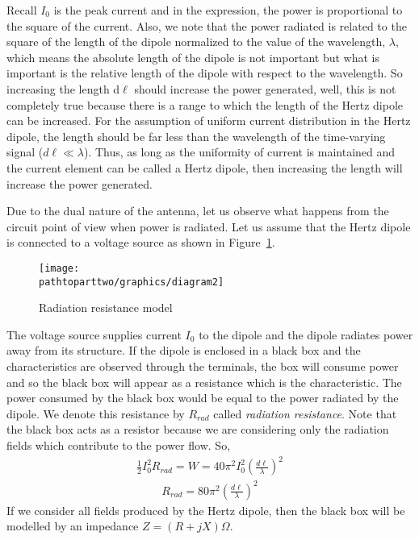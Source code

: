 Recall $I_0$ is the peak current and in the expression, the power is proportional to the square of the current. Also, we note that the power radiated is related to the square of the length of the dipole normalized to the value of the wavelength, $\lambda$, which means the absolute length of the dipole is not important but what is important is the relative length of the dipole with respect to the wavelength. So increasing the length d$\ell$ should increase the power generated, well, this is not completely true because there is a range to which the length of the Hertz dipole can be increased. For the assumption of uniform current distribution in the Hertz dipole, the length should be far less than the wavelength of the time-varying signal ($d\ell \ll \lambda$). Thus, as long as the uniformity of current is maintained and the current element can be called a Hertz dipole, then increasing the length will increase the power generated. 

Due to the dual nature of the antenna, let us observe what happens from the circuit point of view when power is radiated. Let us assume that the Hertz dipole is connected to a voltage source as shown in Figure~\ref{fig:radresistantmodel}.
\begin{figure}[h]
\centering
\texttt{[image: \\pathtoparttwo/graphics/diagram2]}
\caption{Radiation resistance model}
\label{fig:radresistantmodel}
\end{figure}

The voltage source supplies current $I_0$ to the dipole and the dipole radiates power away from its structure. If the dipole is enclosed in a black box and the characteristics are observed through the terminals, the box will consume power and so the black box will appear as a resistance which is the characteristic. The power consumed by the black box would be equal to the power radiated by the dipole. We denote this resistance by $R_{rad}$ called \emph{radiation resistance}. Note that the black box acts as a resistor because we are considering only the radiation fields which contribute to the power flow. So,
\begin{align*}
\frac{1}{2}I_0^2R_{rad} = W = 40\pi^2I_0^2\left(\frac{d\ell}{\lambda}\right)^2
\end{align*}
\begin{align}
R_{rad} = 80\pi^2\left(\frac{d\ell}{\lambda}\right)^2
\label{eqn:radresistance}
\end{align}
If we consider all fields produced by the Hertz dipole, then the black box will be modelled by an impedance $Z = (R + jX)\Omega$. 


